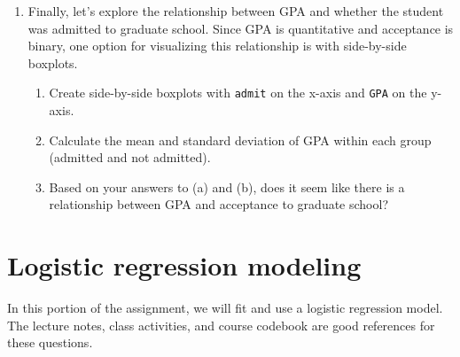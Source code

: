 \documentclass[11pt]{article}
\begin{document}
\begin{enumerate}
\item Finally, let's explore the relationship between GPA and whether the student was admitted to graduate school. Since GPA is quantitative and acceptance is binary, one option for visualizing this relationship is with side-by-side boxplots.

\begin{enumerate}
\item Create side-by-side boxplots with \verb;admit; on the x-axis and \verb;GPA; on the y-axis. 

\item Calculate the mean and standard deviation of GPA within each group (admitted and not admitted).

\item Based on your answers to (a) and (b), does it seem like there is a relationship between GPA and acceptance to graduate school?
\end{enumerate}

\end{enumerate}

\newpage

\section{Logistic regression modeling}

In this portion of the assignment, we will fit and use a logistic regression model. The lecture notes, class activities, and course codebook are good references for these questions.
\end{document}
